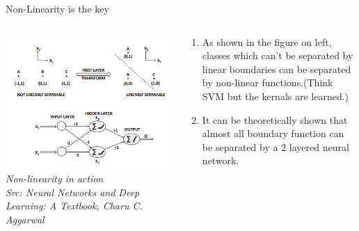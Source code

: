 \begin{frame}{Non-Linearity is the key}
  \begin{columns}[T]
  \begin{column}{0.4\textwidth}
    \includegraphics[width=\textwidth]{images/non-linearity.png}
    \tiny{\textit{Non-linearity in action\\ Src: Neural Networks and Deep Learning: A Textbook, Charu C. Aggarwal}}
  \end{column}
  \begin{column}{0.6\textwidth}
  \begin{enumerate}[$\bullet$]
  \item As shown in the figure on left, classes which can't be separated by linear boundaries can be separated by non-linear functions.(Think SVM but the kernals are learned.)\pause
  \item It can be theoretically shown that almost all boundary function can be separated by a 2 layered neural network.
  \end{enumerate}
  \end{column}
\end{columns}
\end{frame}




